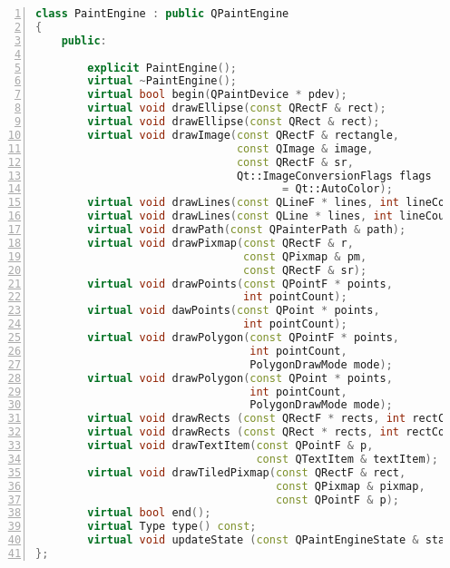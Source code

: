 \begin{lstlisting}[language=C++,numbers=left,caption=Nagłówek klasy \emph{QPaintEngine},label={lst:paintengine}]
class PaintEngine : public QPaintEngine
{
    public:

        explicit PaintEngine();
        virtual ~PaintEngine();
        virtual bool begin(QPaintDevice * pdev);
        virtual void drawEllipse(const QRectF & rect);
        virtual void drawEllipse(const QRect & rect);
        virtual void drawImage(const QRectF & rectangle, 
                               const QImage & image, 
                               const QRectF & sr,
                               Qt::ImageConversionFlags flags 
                                      = Qt::AutoColor);
        virtual void drawLines(const QLineF * lines, int lineCount);
        virtual void drawLines(const QLine * lines, int lineCount);
        virtual void drawPath(const QPainterPath & path);
        virtual void drawPixmap(const QRectF & r, 
                                const QPixmap & pm, 
                                const QRectF & sr);
        virtual void drawPoints(const QPointF * points, 
                                int pointCount);
        virtual void dawPoints(const QPoint * points, 
                                int pointCount);
        virtual void drawPolygon(const QPointF * points, 
                                 int pointCount, 
                                 PolygonDrawMode mode);
        virtual void drawPolygon(const QPoint * points, 
                                 int pointCount, 
                                 PolygonDrawMode mode);
        virtual void drawRects (const QRectF * rects, int rectCount);
        virtual void drawRects (const QRect * rects, int rectCount);
        virtual void drawTextItem(const QPointF & p, 
                                  const QTextItem & textItem);
        virtual void drawTiledPixmap(const QRectF & rect, 
                                     const QPixmap & pixmap, 
                                     const QPointF & p);
        virtual bool end();
        virtual Type type() const;
        virtual void updateState (const QPaintEngineState & state);
};
\end{lstlisting}